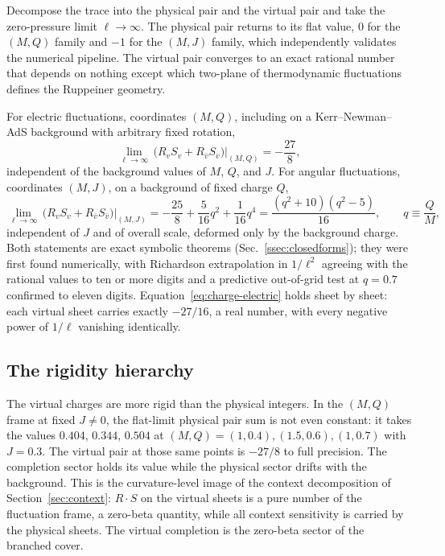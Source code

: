 Decompose the trace into the physical pair and the virtual pair and take the zero-pressure limit $\ell \to \infty$. The physical pair returns to its flat value, $0$ for the $(M,Q)$ family and $-1$ for the $(M,J)$ family, which independently validates the numerical pipeline. The virtual pair converges to an exact rational number that depends on nothing except which two-plane of thermodynamic fluctuations defines the Ruppeiner geometry.

For electric fluctuations, coordinates $(M,Q)$, including on a Kerr--Newman--AdS background with arbitrary fixed rotation,
\begin{equation}
\lim_{\ell\to\infty}\,\bigl(R_v S_v + R_{\bar v} S_{\bar v}\bigr)\Big|_{(M,Q)} = -\frac{27}{8},
\label{eq:charge-electric}
\end{equation}
independent of the background values of $M$, $Q$, and $J$. For angular fluctuations, coordinates $(M,J)$, on a background of fixed charge $Q$,
\begin{equation}
\lim_{\ell\to\infty}\,\bigl(R_v S_v + R_{\bar v} S_{\bar v}\bigr)\Big|_{(M,J)}
= -\frac{25}{8} + \frac{5}{16}q^2 + \frac{1}{16}q^4
= \frac{(q^2+10)(q^2-5)}{16},
\qquad q \equiv \frac{Q}{M},
\label{eq:charge-angular}
\end{equation}
independent of $J$ and of overall scale, deformed only by the background charge. Both statements are exact symbolic theorems (Sec.~\ref{ssec:closedforms}); they were first found numerically, with Richardson extrapolation in $1/\ell^2$ agreeing with the rational values to ten or more digits and a predictive out-of-grid test at $q=0.7$ confirmed to eleven digits. Equation~\eqref{eq:charge-electric} holds sheet by sheet: each virtual sheet carries exactly $-27/16$, a real number, with every negative power of $1/\ell$ vanishing identically.


\subsection{The rigidity hierarchy}

The virtual charges are more rigid than the physical integers. In the $(M,Q)$ frame at fixed $J\neq 0$, the flat-limit physical pair sum is not even constant: it takes the values $0.404$, $0.344$, $0.504$ at $(M,Q) = (1,0.4), (1.5,0.6), (1,0.7)$ with $J=0.3$. The virtual pair at those same points is $-27/8$ to full precision. The completion sector holds its value while the physical sector drifts with the background. This is the curvature-level image of the context decomposition of Section~\ref{sec:context}: $R\cdot S$ on the virtual sheets is a pure number of the fluctuation frame, a zero-beta quantity, while all context sensitivity is carried by the physical sheets. The virtual completion is the zero-beta sector of the branched cover.


